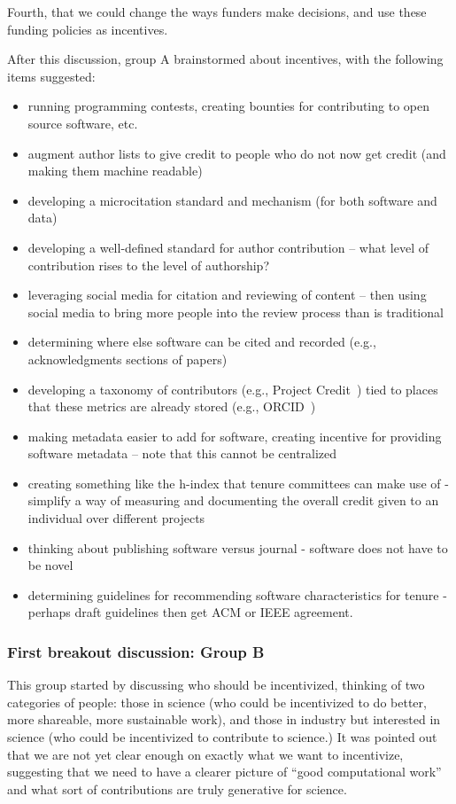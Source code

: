 \documentclass[11pt, oneside]{amsart}
\begin{document}
Fourth, that we could change the ways funders make decisions, and use these
funding policies as incentives.

After this discussion, group A brainstormed about incentives,
with the following items suggested:
\begin{itemize}
\item running programming contests, creating bounties for contributing to open
source software, etc.
\item augment author lists to give credit to people who do not now get credit
(and making them machine readable)
\item developing a microcitation standard and mechanism (for both software and
data)
\item developing a well-defined standard for author contribution -- what level
of contribution rises to the level of authorship?
\item leveraging social media for citation and reviewing of content -- then
using social media to bring more people into the review process than is
traditional
\item determining where else software can be cited and recorded (e.g.,
acknowledgments sections of papers)
\item developing a taxonomy of contributors (e.g., Project
Credit~\cite{projectcredit}) tied to places that these metrics are already
stored (e.g., ORCID~\cite{orcid})
\item making metadata easier to add for software, creating incentive for
providing software metadata -- note that this cannot be centralized
\item creating something like the h-index that tenure committees can make use of
- simplify a way of measuring and documenting the overall credit given to an
individual over different projects
\item thinking about publishing software versus journal - software does not have to
be novel
\item determining guidelines for recommending software characteristics for
tenure - perhaps draft guidelines then get ACM or IEEE agreement.
\end{itemize}


\subsubsection{First breakout discussion: Group B}

This group started by discussing who should be incentivized, thinking of two
categories of people: those in science (who could be incentivized to do better,
more shareable, more sustainable work), and those in industry but interested in
science (who could be incentivized to contribute to science.) It was pointed out
that we are not yet clear enough on exactly what we want to incentivize,
suggesting that we need to have a clearer picture of ``good computational work''
and what sort of contributions are truly generative for science.
\end{document}
